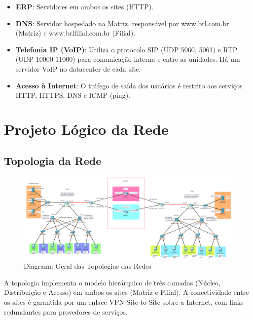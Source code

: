 \documentclass[a4paper, 12pt]{article}
\begin{document}
\begin{itemize}
    \item \textbf{ERP}: Servidores em ambos os sites (HTTP).
    \item \textbf{DNS}: Servidor hospedado na Matriz, responsável por www.brl.com.br (Matriz) e www.brlfilial.com.br (Filial).
    \item \textbf{Telefonia IP (VoIP)}: Utiliza o protocolo SIP (UDP 5060, 5061) e RTP (UDP 10000-11000) para comunicação interna e entre as unidades. Há um servidor VoIP no datacenter de cada site.
    \item \textbf{Acesso à Internet}: O tráfego de saída dos usuários é restrito aos serviços HTTP, HTTPS, DNS e ICMP (ping).
\end{itemize}

\section{Projeto Lógico da Rede}
\label{sec:projeto-logico}

\subsection{Topologia da Rede}
\label{subsec:topologia}

\begin{figure}[H]
    \centering
    \includegraphics[width=1\linewidth]{geral.png}
    \caption{Diagrama Geral das Topologias das Redes}
    \label{fig:geral}
\end{figure}

A topologia implementa o modelo hierárquico de três camadas (Núcleo, Distribuição e Acesso) em ambos os sites (Matriz e Filial). A conectividade entre os sites é garantida por um enlace VPN Site-to-Site sobre a Internet, com links redundantes para provedores de serviços.
\end{document}

